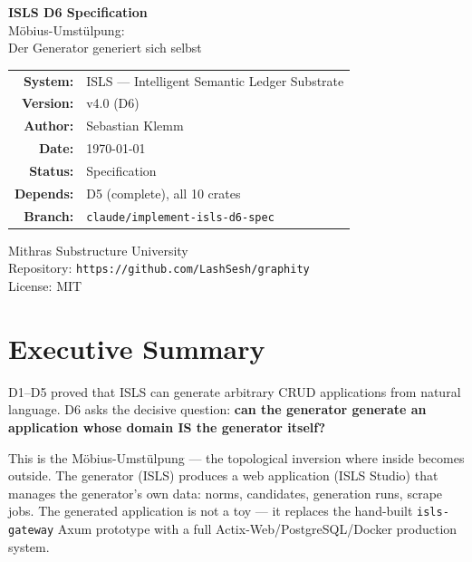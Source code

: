 \documentclass[11pt,a4paper]{article}
\begin{document}
\begin{titlepage}
\centering
\vspace*{3cm}

{\Huge\bfseries\color{isls-blue} ISLS D6 Specification}\\[0.5cm]
{\LARGE\color{isls-orange} M\"obius-Umst\"ulpung:\\Der Generator generiert sich selbst}\\[2cm]

{\large
\begin{tabular}{rl}
\textbf{System:}    & ISLS --- Intelligent Semantic Ledger Substrate \\
\textbf{Version:}   & v4.0 (D6) \\
\textbf{Author:}    & Sebastian Klemm \\
\textbf{Date:}      & \today \\
\textbf{Status:}    & Specification \\
\textbf{Depends:}   & D5 (complete), all 10 crates \\
\textbf{Branch:}    & \texttt{claude/implement-isls-d6-spec} \\
\end{tabular}
}

\vfill

{\small\color{isls-gray}
Mithras Substructure University\\
Repository: \texttt{https://github.com/LashSesh/graphity}\\
License: MIT
}
\end{titlepage}

\tableofcontents
\newpage


\section{Executive Summary}

D1--D5 proved that ISLS can generate arbitrary CRUD applications from
natural language. D6 asks the decisive question: \textbf{can the generator
generate an application whose domain IS the generator itself?}

This is the M\"obius-Umst\"ulpung --- the topological inversion where
inside becomes outside. The generator (ISLS) produces a web application
(ISLS Studio) that manages the generator's own data: norms, candidates,
generation runs, scrape jobs. The generated application is not a toy ---
it replaces the hand-built \texttt{isls-gateway} Axum prototype with a
full Actix-Web/PostgreSQL/Docker production system.
\end{document}
